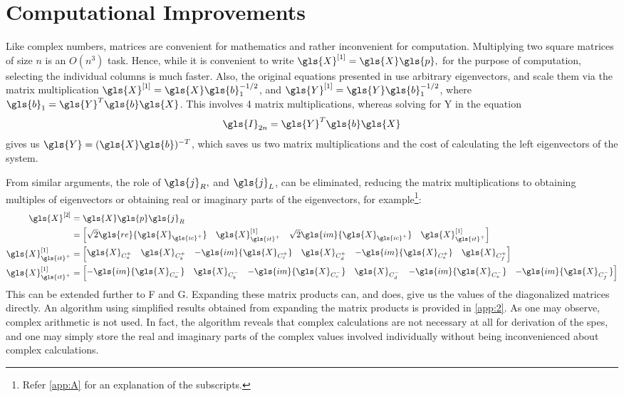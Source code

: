 \section{Computational Improvements}
Like complex numbers, matrices are convenient for mathematics and rather 
inconvenient for computation. Multiplying two square matrices of size $n$
is an $O(n^3)$ task. Hence, while it is convenient to write 
$\gls{X}^{[1]} = \gls{X}\gls{p},$ for the purpose of computation,
selecting the individual columns is much faster. Also, the original equations
presented in \citet{Chu200896} use arbitrary eigenvectors, and scale them via 
the matrix multiplication $\gls{X}^{[1]} = \gls{X}\gls{b}_1^{-1/2}$, and
$\gls{Y}^{[1]} = \gls{Y}\gls{b}_1^{-1/2}$, where 
$\gls{b}_1 = \gls{Y}^T\gls{b}\gls{X}$. This involves 4 matrix 
multiplications, whereas solving for \gls{Y} in the equation 
\begin{align}
	 \gls{I}_{2n} = \gls{Y}^T\gls{b}\gls{X}
\end{align}
gives us $\gls{Y} = (\gls{X}\gls{b})^{-T}$, which saves us two matrix 
multiplications and the cost of calculating the left eigenvectors of
the system.

From similar arguments, the role of $\gls{j}_R,$ and $ \gls{j}_L$,
can be eliminated, reducing the matrix multiplications to obtaining 
multiples of eigenvectors or obtaining real or imaginary parts of the
eigenvectors, for example\footnote{Refer \autoref{app:A} for an 
explanation of the subscripts.}:
\begin{subequations}
\label{eqn:exp_x}
\begin{align}
\gls{X}^{[2]} &= \gls{X}\gls{p}\gls{j}_R \nonumber \\
&= \begin{bmatrix}
\sqrt{2}\gls{re}{\gls{X}_{\gls{ic}^+}} & \gls{X}_{\gls{it}^+}^{[1]} & \sqrt{2}\gls{im}{\gls{X}_{\gls{ic}^+}} & \gls{X}_{\gls{it}^+}^{[1]}
\end{bmatrix}\\
\gls{X}_{\gls{it}^+}^{[1]} &= \begin{bmatrix}
\gls{X}_{C_a^+} & \gls{X}_{C_b^+} & -\gls{im}{\gls{X}_{C_c^+}} & \gls{X}_{C_d^+} & -\gls{im}{\gls{X}_{C_e^+}} & \gls{X}_{C_f^+}
\end{bmatrix}\\
\gls{X}_{\gls{it}^+}^{[1]} &= \begin{bmatrix}
-\gls{im}{\gls{X}_{C_a^-}} & \gls{X}_{C_b^-} & -\gls{im}{\gls{X}_{C_c^-}} & \gls{X}_{C_d^-} & -\gls{im}{\gls{X}_{C_e^-}} & -\gls{im}{\gls{X}_{C_f^-}}
\end{bmatrix}
\end{align}
\end{subequations}
This can be extended further to \gls{F} and \gls{G}. Expanding these 
matrix products can, and does, give us the values of the diagonalized 
matrices directly. An algorithm using simplified results obtained from 
expanding the matrix products is provided in \autoref{app:2}. As one may 
observe, complex arithmetic is not used. In fact, the algorithm reveals 
that complex calculations are not necessary at all for derivation of the 
\glspl{spe}, and one may simply store the real and imaginary parts of the 
complex values involved individually without being inconvenienced about 
complex calculations.

